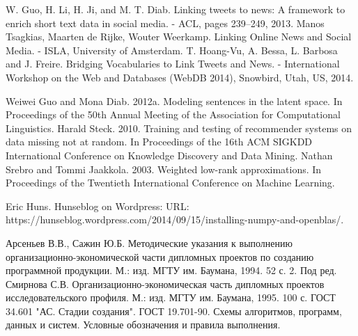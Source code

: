 
\begin{thebibliography}{0}
     W. Guo, H. Li, H. Ji, and M. T. Diab. Linking tweets to news: A framework to enrich short text data in social media. - ACL, pages 239–249, 2013.
     Manos Tsagkias, Maarten de Rijke, Wouter Weerkamp. Linking Online News and Social Media. - ISLA, University of Amsterdam.
     T. Hoang-Vu, A. Bessa, L. Barbosa and J. Freire. Bridging Vocabularies to Link Tweets and News. - International Workshop on the Web and Databases (WebDB 2014), Snowbird, Utah, US, 2014.

     Weiwei Guo and Mona Diab. 2012a. Modeling sentences in the latent space. In Proceedings of the 50th Annual Meeting of the Association for Computational Linguistics.
     Harald Steck. 2010. Training and testing of recommender systems on data missing not at random. In Proceedings of the 16th ACM SIGKDD International Conference on Knowledge Discovery and Data Mining.
     Nathan Srebro and Tommi Jaakkola. 2003. Weighted low-rank approximations. In Proceedings of the Twentieth International Conference on Machine Learning.

     Eric Huns. Hunseblog on Wordpress: URL: https://hunseblog.wordpress.com/2014/09/15/installing-numpy-and-openblas/.

     Арсеньев В.В., Сажин Ю.Б. Методические указания к выполнению организационно-экономической части дипломных проектов по созданию программной продукции. М.: изд. МГТУ им. Баумана, 1994. 52 с. 2.
     Под ред. Смирнова С.В. Организационно-экономическая часть дипломных проектов исследовательского профиля. М.: изд. МГТУ им. Баумана, 1995. 100 с.
     ГОСТ 34.601 "АС. Стадии создания".
     ГОСТ 19.701-90. Схемы алгоритмов, программ, данных и систем. Условные обозначения и правила выполнения.

\end{thebibliography}